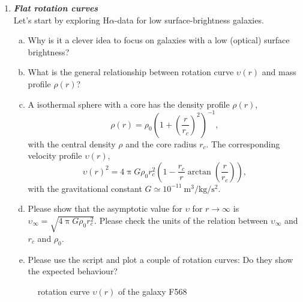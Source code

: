 \documentclass[a4paper,12pt]{article}
\newcommand{\question}[1]{\textbf{\textit{#1}}}
\renewcommand{\pi}{\uppi}
\begin{document}
\begin{enumerate}

\item \question{Flat rotation curves}\\
Let's start by exploring H$\alpha$-data for low surface-brightness galaxies.
\begin{enumerate}[(a)]
\item{Why is it a clever idea to focus on galaxies with a low (optical) surface brightness?}
\item{What is the general relationship between rotation curve $\upsilon(r)$ and mass profile $\rho(r)$?}
\item{A isothermal sphere with a core has the density profile $\rho(r)$,
\begin{equation}
\rho(r) = \rho_0\left(1+\left(\frac{r}{r_c}\right)^2\right)^{-1},
\end{equation}
with the central density $\rho$ and the core radius $r_c$. The corresponding velocity profile $\upsilon(r)$,
\begin{equation}
\upsilon(r)^2 = 4\pi G\rho_0 r_c^2\left(1-\frac{r_c}{r}\arctan\left(\frac{r}{r_c}\right)\right),
\end{equation}
with the gravitational constant $G\simeq 10^{-11}~\mathrm{m}^3/\mathrm{kg}/\mathrm{s}^2$.}
\item{Please show that the asymptotic value for $\upsilon$ for $r\rightarrow\infty$ is $\upsilon_\infty = \sqrt{4\pi G\rho_0r_c^2}$. Please check the units of the relation between $\upsilon_\infty$ and $r_c$ and $\rho_0$.}
\item{Please use the script  and plot a couple of rotation curves: Do they show the expected behaviour?}
\end{enumerate}

\begin{figure}[h]
\begin{center}
\caption{rotation curve $\upsilon(r)$ of the galaxy F568}
\end{center}
\end{figure}


\end{enumerate}
\end{document}
